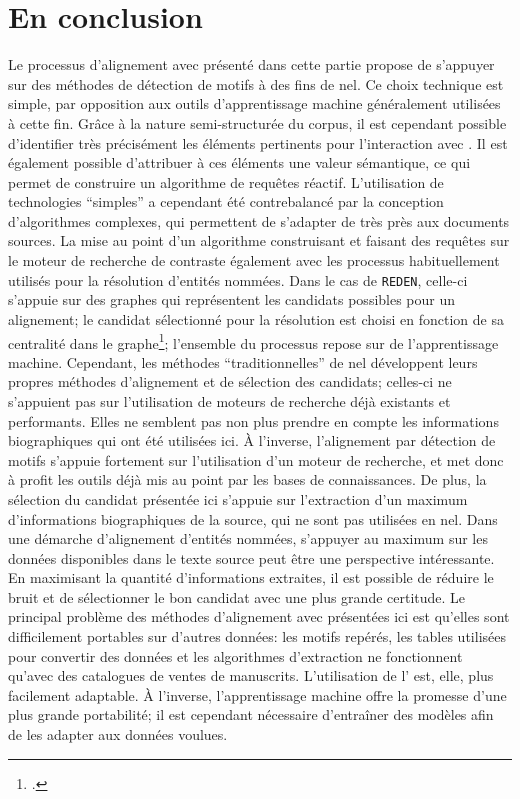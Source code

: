 \section{En conclusion}
Le processus d'alignement avec \wkd{} présenté dans cette partie propose de s'appuyer sur des méthodes de détection de motifs à des fins de \gls{nel}. Ce choix technique est simple, par opposition aux outils d'apprentissage machine généralement utilisées à cette fin. Grâce à la nature semi-structurée du corpus, il est cependant possible d'identifier très précisément les éléments pertinents pour l'interaction avec \wkd{}. Il est également possible d'attribuer à ces éléments une valeur sémantique, ce qui permet de construire un algorithme de requêtes réactif. L'utilisation de technologies \enquote{simples} a cependant été contrebalancé par la conception d'algorithmes complexes, qui permettent de s'adapter de très près aux documents sources. La mise au point d'un algorithme construisant et faisant des requêtes sur le moteur de recherche de \wkd{} contraste également avec les processus habituellement utilisés pour la résolution d'entités nommées.  Dans le cas de \texttt{REDEN}, celle-ci s'appuie sur des graphes qui représentent les candidats possibles pour un alignement; le candidat sélectionné pour la résolution est choisi en fonction de sa centralité dans le graphe\footcite[p. 72]{brando_reden_2016}; l'ensemble du processus repose sur de l'apprentissage machine. Cependant, les méthodes \enquote{traditionnelles} de \gls{nel} développent leurs propres méthodes d'alignement et de sélection des candidats; celles-ci ne s'appuient pas sur l'utilisation de moteurs de recherche déjà existants et performants. Elles ne semblent pas non plus prendre en compte les informations biographiques qui ont été utilisées ici. À l'inverse, l'alignement par détection de motifs s'appuie fortement sur l'utilisation d'un moteur de recherche, et met donc à profit les outils déjà mis au point par les bases de connaissances. De plus, la sélection du candidat présentée ici s'appuie sur l'extraction d'un maximum d'informations biographiques de la source, qui ne sont pas utilisées en \gls{nel}. Dans une démarche d'alignement d'entités nommées, s'appuyer au maximum sur les données disponibles dans le texte source peut être une perspective intéressante. En maximisant la quantité d'informations extraites, il est possible de réduire le bruit et de sélectionner le bon candidat avec une plus grande certitude. Le principal problème des méthodes d'alignement avec \wkd{} présentées ici est qu'elles sont difficilement portables sur d'autres données: les motifs repérés, les tables utilisées pour convertir des données et les algorithmes d'extraction ne fonctionnent qu'avec des catalogues de ventes de manuscrits. L'utilisation de l'\api{} \wkd{} est, elle, plus facilement adaptable. À l'inverse, l'apprentissage machine offre la promesse d'une plus grande portabilité; il est cependant nécessaire d'entraîner des modèles afin de les adapter aux données voulues.

